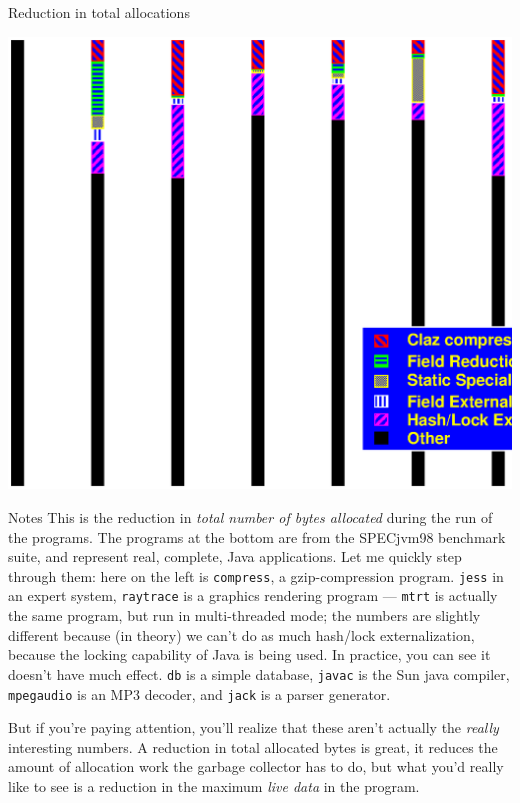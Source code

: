 \documentclass[%
pdf,
colorBG,
slideColor,
nototal,
oqe
]{prosper}
\newenvironment{talknotes}{\begin{slide}{Notes}\tiny}{\end{slide}}
\begin{document}
\begin{slide}{Reduction in total allocations}
\begin{center}
\includegraphics[scale=0.45]{Figures/oopsla-ttlalloc-color.eps}
\end{center}
\end{slide}

\begin{talknotes}
This is the reduction in \emph{total number of bytes allocated} during
the run of the programs.  The programs at the bottom are from the
SPECjvm98 benchmark suite, and represent real, complete, Java
applications.  Let me quickly step through them: here on the left is
{\tt compress}, a gzip-compression program.  {\tt jess} in an expert
system, {\tt raytrace} is a graphics rendering program --- {\tt mtrt}
is actually the same program, but run in multi-threaded mode; the
numbers are slightly different because (in theory) we can't do as much
hash/lock externalization, because the locking capability of Java is
being used.  In practice, you can see it doesn't have much effect.
{\tt db} is a simple database, {\tt javac} is the Sun java compiler,
{\tt mpegaudio} is an MP3 decoder, and {\tt jack} is a parser
generator.

But if you're paying attention, you'll realize that these aren't
actually the \emph{really} interesting numbers.  A reduction in total
allocated bytes is great, it reduces the amount of allocation work the
garbage collector has to do, but what you'd really like to see is a
reduction in the maximum \emph{live data} in the program.

~%
\end{talknotes}
\end{document}
